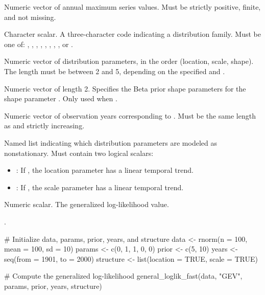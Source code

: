 \documentclass[a4paper]{book}
\begin{document}
\begin{Arguments}
\begin{ldescription}
\item[\code{data}] Numeric vector of annual maximum series values.
Must be strictly positive, finite, and not missing.

\item[\code{distribution}] Character scalar. A three-character code indicating
a distribution family. Must be one of: , , ,
, , , , , or .

\item[\code{params}] Numeric vector of distribution parameters, in the order (location,
scale, shape). The length must be between 2 and 5, depending on the specified
 and .

\item[\code{prior}] Numeric vector of length 2. Specifies the Beta prior shape
parameters  for the shape parameter \eqn{\kappa}{}.
Only used when .

\item[\code{years}] Numeric vector of observation years corresponding to .
Must be the same length as  and strictly increasing.

\item[\code{structure}] Named list indicating which distribution parameters are
modeled as nonstationary. Must contain two logical scalars:
\begin{itemize}

\item{} : If , the location parameter has a linear temporal trend.
\item{} : If , the scale parameter has a linear temporal trend.

\end{itemize}

\end{ldescription}
\end{Arguments}
%
\begin{Value}
Numeric scalar. The generalized log-likelihood value.
\end{Value}
%
\begin{SeeAlso}
.
\end{SeeAlso}
%
\begin{Examples}
\begin{ExampleCode}
# Initialize data, params, prior, years, and structure
data <- rnorm(n = 100, mean = 100, sd = 10)
params <- c(0, 1, 1, 0, 0)
prior <- c(5, 10)
years <- seq(from = 1901, to = 2000)
structure <- list(location = TRUE, scale = TRUE)

# Compute the generalized log-likelihood
general_loglik_fast(data, "GEV", params, prior, years, structure)

\end{ExampleCode}
\end{Examples}
\end{document}

